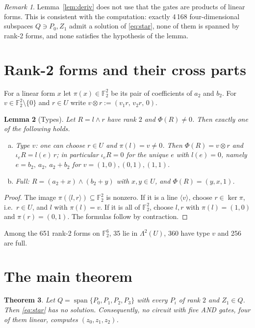 \documentclass[11pt,a4paper]{article}
\theoremstyle{plain}
\newtheorem{theorem}{Theorem}
\newtheorem{lemma}[theorem]{Lemma}
\theoremstyle{definition}
\theoremstyle{remark}
\newtheorem{remark}[theorem]{Remark}
\newcommand{\F}{\mathbb{F}_2}
\newcommand{\Span}{\operatorname{span}}
\newcommand{\Lam}{\Lambda^{2}}
\begin{document}
\begin{remark}
Lemma~\ref{lem:deriv} does not use that the gates are products of linear forms. This is consistent with the computation: exactly 4\,168 four-dimensional subspaces $Q\ni P_0,Z_1$ admit a solution of \eqref{eq:star}, none of them is spanned by rank-2 forms, and none satisfies the hypothesis of the lemma.
\end{remark}

\section{Rank-2 forms and their cross parts}

For a linear form $x$ let $\pi(x)\in\F^2$ be its pair of coefficients of $a_2$ and $b_2$. For $v\in\F^2\setminus\{0\}$ and $r\in U$ write $v\otimes r:=(v_1r,\,v_2r,\,0)$.

\begin{lemma}[Types]\label{lem:types}
Let $R=l\wedge r$ have rank $2$ and $\Phi(R)\neq0$. Then exactly one of the following holds.
\begin{enumerate}[(a)]
  \item \emph{Type $v$:} one can choose $r\in U$ and $\pi(l)=v\neq0$. Then $\Phi(R)=v\otimes r$ and $\iota_eR=l(e)\,r$; in particular $\iota_eR=0$ for the unique $e$ with $l(e)=0$, namely $e=b_2,\ a_2,\ a_2+b_2$ for $v=(1,0),(0,1),(1,1)$.
  \item \emph{Full:} $R=(a_2+x)\wedge(b_2+y)$ with $x,y\in U$, and $\Phi(R)=(y,x,1)$.
\end{enumerate}
\end{lemma}

\begin{proof}
The image $\pi(\langle l,r\rangle)\subseteq\F^2$ is nonzero. If it is a line $\langle v\rangle$, choose $r\in\ker\pi$, i.e.\ $r\in U$, and $l$ with $\pi(l)=v$. If it is all of $\F^2$, choose $l,r$ with $\pi(l)=(1,0)$ and $\pi(r)=(0,1)$. The formulas follow by contraction.
\end{proof}

Among the 651 rank-2 forms on $\F^6$, 35 lie in $\Lam(U)$, 360 have type $v$ and 256 are full.

\section{The main theorem}

\begin{theorem}\label{thm:main}
Let $Q=\Span\{P_0,P_1,P_2,P_3\}$ with every $P_i$ of rank $2$ and $Z_1\in Q$. Then \eqref{eq:star} has no solution. Consequently, no circuit with five AND gates, four of them linear, computes $(z_0,z_1,z_2)$.
\end{theorem}
\end{document}
